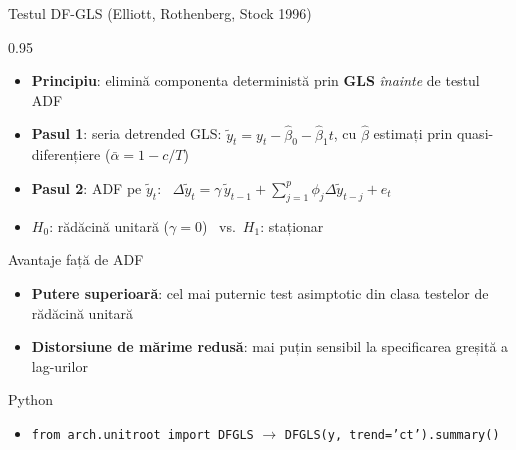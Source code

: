\documentclass[9pt, aspectratio=169, t]{beamer}
\begin{document}
\begin{frame}{Testul DF-GLS (Elliott, Rothenberg, Stock 1996)}
    \begin{cminipage}{0.95\textwidth}
        \vspace{-0.3cm}
        {\footnotesize
        \begin{defn}
            \begin{itemize}\setlength{\itemsep}{0pt}
                \item \textbf{Principiu}: elimină componenta deterministă prin \textbf{GLS} \textit{înainte} de testul ADF
                \item \textbf{Pasul 1}: seria detrended GLS: $\tilde{y}_t = y_t - \hat{\beta}_0 - \hat{\beta}_1 t$, cu $\hat{\beta}$ estimați prin quasi-diferențiere ($\bar{\alpha} = 1 - c/T$)
                \item \textbf{Pasul 2}: ADF pe $\tilde{y}_t$: \ $\Delta \tilde{y}_t = \gamma\, \tilde{y}_{t-1} + \sum_{j=1}^{p} \phi_j \Delta \tilde{y}_{t-j} + e_t$
                \item $H_0$: rădăcină unitară ($\gamma = 0$) \ vs.\ $H_1$: staționar
            \end{itemize}
        \end{defn}
        \vspace{-1mm}
        \begin{block}{Avantaje față de ADF}
            \begin{itemize}\setlength{\itemsep}{0pt}
                \item \textbf{Putere superioară}: cel mai puternic test asimptotic din clasa testelor de rădăcină unitară
                \item \textbf{Distorsiune de mărime redusă}: mai puțin sensibil la specificarea greșită a lag-urilor
            \end{itemize}
        \end{block}
        \vspace{-1mm}
        \begin{exampleblock}{Python}
            \begin{itemize}\setlength{\itemsep}{0pt}
                \item \texttt{from arch.unitroot import DFGLS} \quad $\rightarrow$ \quad \texttt{DFGLS(y, trend='ct').summary()}
            \end{itemize}
        \end{exampleblock}
        }
    \end{cminipage}
\end{frame}
\end{document}
